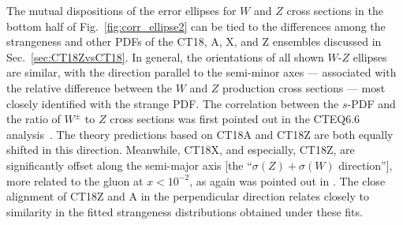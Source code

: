 The mutual dispositions of the error ellipses for $W$ and $Z$ cross sections in the bottom half of Fig.~\ref{fig:corr_ellipse2} can be tied to the differences among the strangeness and other PDFs of the CT18, A, X, and Z ensembles discussed in Sec.~\ref{sec:CT18ZvsCT18}. In general, the orientations of all shown $W$-$Z$ ellipses are similar, with
the direction parallel to the semi-minor axes --- associated with the relative difference between the $W$ and
$Z$ production cross sections --- most closely identified with the strange PDF. 
The correlation between the $s$-PDF and the ratio of $W^\pm$ to $Z$ cross sections was first pointed out in the CTEQ6.6 analysis~\cite{Nadolsky:2008zw}.
The theory predictions based on
CT18A and CT18Z are both equally shifted in this direction. Meanwhile, CT18X, and especially, CT18Z, are
significantly offset along the semi-major axis [the ``$\sigma(Z)\!+\!\sigma(W)$ direction''], more related to the gluon at $x<10^{-2}$, as again was pointed out in \cite{Nadolsky:2008zw}. 
The close alignment of CT18Z and A in the perpendicular direction relates closely to similarity in the fitted strangeness
distributions obtained under these fits.

